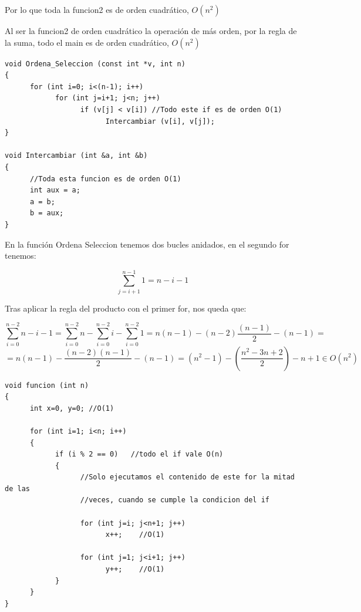 \documentclass[10pt,a4paper,spanish]{report}
\begin{document}
\noindent
Por lo que toda la funcion2 es de orden cuadrático, $O(n^{2})$

\noindent
Al ser la funcion2 de orden cuadrático la operación de más orden, por la regla de la suma, todo el main es de orden cuadrático, $O(n^{2})$

\begin{verbatim}
void Ordena_Seleccion (const int *v, int n)
{
      for (int i=0; i<(n-1); i++)
            for (int j=i+1; j<n; j++)
                  if (v[j] < v[i]) //Todo este if es de orden O(1)
                        Intercambiar (v[i], v[j]);
}

void Intercambiar (int &a, int &b)
{
      //Toda esta funcion es de orden O(1)
      int aux = a;
      a = b;
      b = aux;
}
\end{verbatim}

\noindent
En la función Ordena Seleccion tenemos dos bucles anidados, en el segundo for tenemos:

\begin{displaymath}
\sum_{j=i+1}^{n-1} 1 = n - i -1
\end{displaymath}

\noindent
Tras aplicar la regla del producto con el primer for, nos queda que:

\begin{displaymath}
\sum_{i=0}^{n-2} n - i - 1 = \sum_{i=0}^{n-2} n - \sum_{i=0}^{n-2} i - \sum_{i=0}^{n-2} 1 = n(n-1) - (n-2)\frac{(n-1)}{2} - (n-1) =
\end{displaymath}
\begin{displaymath}
= n(n-1) - \frac{(n-2)(n-1)}{2} - (n-1) = (n^{2}-1) - (\frac{n^{2}-3n+2}{2}) - n + 1 \in O(n^{2})
\end{displaymath}

\begin{verbatim}
void funcion (int n)
{
      int x=0, y=0; //O(1)

      for (int i=1; i<n; i++)
      {
            if (i % 2 == 0)   //todo el if vale O(n)
            {
                  //Solo ejecutamos el contenido de este for la mitad de las
                  //veces, cuando se cumple la condicion del if

                  for (int j=i; j<n+1; j++)
                        x++;    //O(1)

                  for (int j=1; j<i+1; j++)
                        y++;    //O(1)
            }
      }
}
\end{verbatim}
\end{document}
